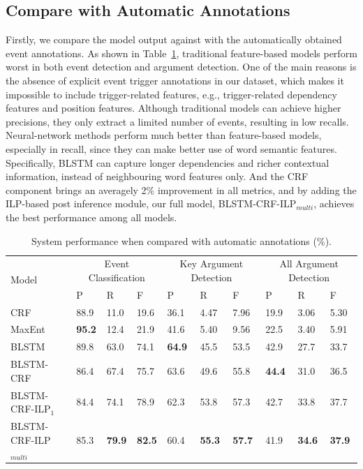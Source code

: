 \subsection{Compare with Automatic Annotations}
Firstly, we compare the model output against with the automatically obtained event annotations.
As shown in Table~\ref{tab:1}, traditional feature-based models perform worst in both event detection and argument detection.
One of the main reasons is the absence of explicit event trigger annotations in our dataset, which makes it impossible to include trigger-related features, e.g., trigger-related dependency features and position features.
Although traditional models can achieve higher precisions, they only extract a limited number of events, resulting in low recalls.
Neural-network methods perform much better than feature-based models, especially in recall, since they can make better use of word semantic features. Specifically, BLSTM can capture longer dependencies and richer contextual information, instead of neighbouring word features only.
And the CRF component brings an averagely 2\% improvement in all metrics, and by adding the ILP-based post inference module, our full model, BLSTM-CRF-ILP$_{multi}$, achieves the best performance among all models.

\begin{table}[!t]
\centering
\small
\begin{tabular}{|l|p{}<{\centering}|p{}<{\centering}|p{}<{\centering}|p{}<{\centering}|p{}<{\centering}|p{}<{\centering}|p{}<{\centering}|p{}<{\centering}|p{}<{\centering}|} \hline
	\multirow{2}{*}{Model} & \multicolumn{3}{c|}{Event Classification} & \multicolumn{3}{c|}{Key Argument Detection} &
	\multicolumn{3}{c|}{All Argument Detection} \\ \cline{2-10}
	 & P & R & F & P & R & F & P & R & F \\ \hline
	CRF & 88.9 & 11.0 & 19.6 & 36.1 & 4.47 & 7.96 & 19.9 & 3.06 & 5.30  \\ \hline
	MaxEnt & \textbf{95.2} & 12.4 & 21.9 & 41.6 & 5.40 & 9.56 & 22.5 & 3.40 & 5.91 \\ \hline
	BLSTM & 89.8 & 63.0 & 74.1 & \textbf{64.9} & 45.5 & 53.5 & 42.9 & 27.7 & 33.7  \\ \hline \hline
	BLSTM-CRF & 86.4 & 67.4 & 75.7 & 63.6 & 49.6 & 55.8 & \textbf{44.4} & 31.0 & 36.5  \\ \hline
	BLSTM-CRF-ILP$_{1}$ & 84.4 & 74.1 & 78.9 & 62.3 & 53.8 & 57.3 & 42.7 & 33.8 & 37.7 \\ \hline
	BLSTM-CRF-ILP$_{multi}$ & 85.3 & \textbf{79.9} & \textbf{82.5} & 60.4 & \textbf{55.3} & \textbf{57.7} & 41.9 & \textbf{34.6} & \textbf{37.9} \\ \hline
\end{tabular}
\caption{System performance when compared with automatic annotations (\%).  \label{tab:1}}
\end{table}

